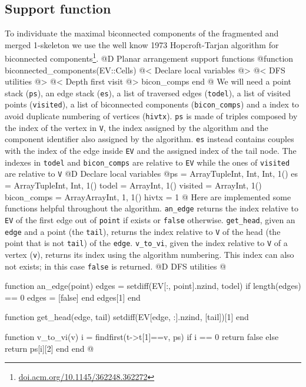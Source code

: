 \documentclass[10pt,oneside]{article}
\begin{document}
\subsection{Support function}
\label{sec:biconnected_components}
To individuate the maximal biconnected components of the fragmented and merged 1-skeleton
we use the well know 1973 Hopcroft-Tarjan algorithm for biconnected components\footnote{\url{doi.acm.org/10.1145/362248.362272}}.
@D Planar arrangement support functions
@{function biconnected_components(EV::Cells)
    @< Declare local variables @>
    @< DFS utilities @>
    @< Depth first visit @>
    bicon_comps
end
@}
We will need a point stack (\texttt{ps}), an edge stack (\texttt{es}), a list of traversed edges (\texttt{todel}), a list of 
visited points (\texttt{visited}), a list of biconnected components (\texttt{bicon\_comps}) and a index to avoid duplicate 
numbering of vertices (\texttt{hivtx}). \texttt{ps} is made of triples composed by the index of the vertex in \texttt{V}, 
the index assigned by the algorithm and the component identifier also assigned by the algorithm. \texttt{es} instead 
contains couples with the index of the edge inside \texttt{EV} and the assigned index of the tail node. The indexes 
in \texttt{todel} and \texttt{bicon\_comps} are relative to \texttt{EV} while the ones of \texttt{visited} are
relative to \texttt{V}
@D Declare local variables
@{ps = Array{Tuple{Int, Int, Int}, 1}()
es = Array{Tuple{Int, Int}, 1}()
todel = Array{Int, 1}()
visited = Array{Int, 1}()
bicon_comps = Array{Array{Int, 1}, 1}()
hivtx = 1
@}
Here are implemented some functions helpful throughout the algorithm.
\texttt{an\_edge} returns the index relative to \texttt{EV} of the first edge out of \texttt{point} if exists or 
\texttt{false} otherwise. \texttt{get\_head}, given an \texttt{edge} and a point (the \texttt{tail}), returns the 
index relative to \texttt{V} of the head (the point that is not \texttt{tail}) of the \texttt{edge}. 
\texttt{v\_to\_vi}, given the index relative to \texttt{V} of a vertex (\texttt{v}), returns its index using 
the algorithm numbering. This index can also not exists; in this case \texttt{false} is returned.
@D DFS utilities
@{function an_edge(point)
    edges = setdiff(EV[:, point].nzind, todel)
    if length(edges) == 0
        edges = [false]
    end
    edges[1]
end

function get_head(edge, tail)
    setdiff(EV[edge, :].nzind, [tail])[1]
end

function v_to_vi(v)
    i = findfirst(t->t[1]==v, ps)
    if i == 0
        return false
    else
        return ps[i][2]
    end
end
@}
\end{document}
